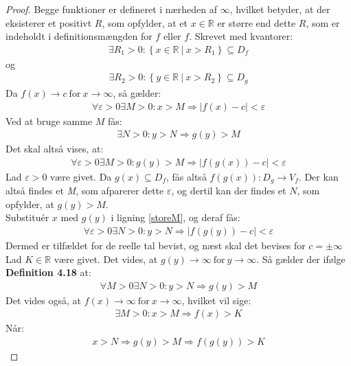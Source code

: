 \documentclass[12pt]{article}
\begin{document}
\begin{proof}
Begge funktioner er defineret i nærheden af $\infty$, hvilket betyder, at der eksisterer et positivt $R$, som opfylder, at et $x\in\mathbb{R}$ er større end dette $R$, som er indeholdt i definitionsmængden for $f$ eller $f$. Skrevet med kvantorer:
\begin{align}
\exists R_1 > 0 : \left\lbrace x \in \mathbb{R} \ \vert \ x>R_1 \right\rbrace \subseteq D_f
\end{align}
og
\begin{align}
\exists R_2 > 0 : \left\lbrace y \in \mathbb{R} \ \vert \ x>R_2 \right\rbrace \subseteq D_g
\end{align}
Da $f(x) \rightarrow c \ \text{for} \ x \rightarrow \infty$, så gælder:
\begin{align}
\forall \varepsilon > 0 \exists M > 0 : x > M \Rightarrow \vert f(x) - c \vert < \varepsilon
\label{storeM}
\end{align}
Ved at bruge samme $M$ fås:
\begin{align}
\exists N > 0 : y > N \Rightarrow g(y) > M
\end{align}
Det skal altså vises, at:
\begin{align}
\forall \varepsilon > 0 \exists M > 0 : g(y) > M \Rightarrow \vert f(g(x)) - c \vert < \varepsilon
\end{align}
Lad $\varepsilon > 0$ være givet. Da $g(x) \subseteq D_f$, fås altså $f(g(x)):D_g \to V_f$. Der kan altså findes et \textit{M}, som afparerer dette $\varepsilon$, og dertil kan der findes et $N$, som opfylder, at $g(y)>M$. \\
Substituér $x$ med $g(y)$ i ligning \eqref{storeM}, og deraf fås:
\begin{align}
\forall \varepsilon > 0 \exists N > 0 : y > N \Rightarrow \vert f(g(y)) - c \vert < \varepsilon
\end{align}
Dermed er tilfældet for de reelle tal bevist, og næst skal det bevises for $ c = \pm \infty$
Lad $K \in \mathbb{R}$ være givet. Det vides, at $g(y) \rightarrow \infty \ \text{for} \ y \rightarrow \infty$. Så gælder der ifølge \textbf{Definition 4.18} at:
\begin{align}
\forall M > 0 \exists N > 0 : y > N \Rightarrow g(y) > M
\end{align}
Det vides også, at $f(x) \rightarrow \infty \ \text{for} \ x \rightarrow \infty$, hvilket vil sige:
\begin{align}
\exists M > 0 : x > M \Rightarrow f(x) > K
\end{align}
Når:
\begin{align}
x > N \Rightarrow g(y) > M \Rightarrow f(g(y)) > K
\end{align}
\end{proof}
\end{document}
